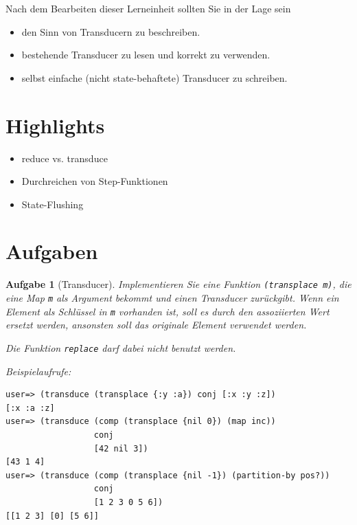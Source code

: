 \documentclass[11pt,a4paper]{article}
\newcounter{numb}
\theoremstyle{break}
\newtheorem{aufgabe}{Aufgabe}[numb]
\begin{document}
Nach dem Bearbeiten dieser Lerneinheit sollten Sie in der Lage sein

\begin{itemize}
    \item den Sinn von Transducern zu beschreiben.
    \item bestehende Transducer zu lesen und korrekt zu verwenden.
    \item selbst einfache (nicht state-behaftete) Transducer zu schreiben.
\end{itemize}

\section{Highlights}

\begin{itemize}
    \item reduce vs. transduce
    \item Durchreichen von Step-Funktionen
    \item State-Flushing
\end{itemize}



\section{Aufgaben}

\begin{aufgabe}[Transducer]

Implementieren Sie eine Funktion \verb|(transplace m)|,
die eine Map \verb|m| als Argument bekommt und einen Transducer zur\"uckgibt.
Wenn ein Element als Schl\"ussel in \verb|m| vorhanden ist,
soll es durch den assoziierten Wert ersetzt werden,
ansonsten soll das originale Element verwendet werden.

Die Funktion \texttt{replace} darf dabei nicht benutzt werden.

\vspace{8px}
Beispielaufrufe:
\begin{verbatim}
user=> (transduce (transplace {:y :a}) conj [:x :y :z])
[:x :a :z]
user=> (transduce (comp (transplace {nil 0}) (map inc))
                  conj
                  [42 nil 3])
[43 1 4]
user=> (transduce (comp (transplace {nil -1}) (partition-by pos?)) 
                  conj
                  [1 2 3 0 5 6])
[[1 2 3] [0] [5 6]]
\end{verbatim} 
\end{aufgabe} 
\end{document}
